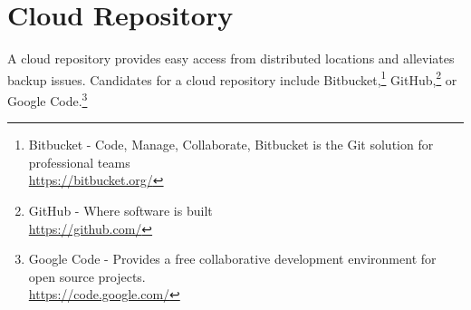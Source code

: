 
\newpage
\section{Cloud Repository}
A cloud repository provides easy access from distributed
locations and alleviates backup issues.  Candidates for
a cloud repository include Bitbucket,\footnote{Bitbucket - Code, Manage, Collaborate,
Bitbucket is the Git solution for professional teams\\
\href{https://bitbucket.org/}{https://bitbucket.org/}}
GitHub,\footnote{GitHub - Where software is built\\
\href{https://github.com/}{https://github.com/}}
or Google Code.\footnote{Google Code - Provides a free collaborative development environment
for open source projects.\\
\href{https://code.google.com/}{https://code.google.com/}}


